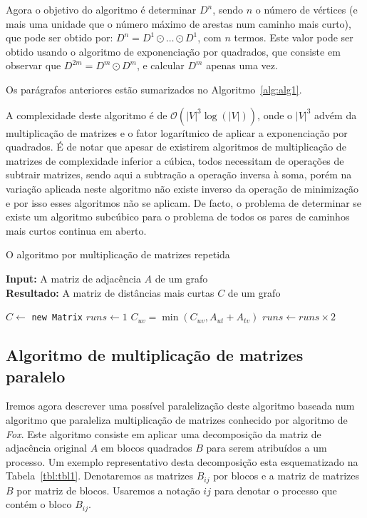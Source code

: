 \documentclass[10pt,a4paper,oneside]{article}
\newcommand{\BigO}[1]{\mathcal{O}(#1)}
\begin{document}
Agora o objetivo do algoritmo é determinar $D^n$, sendo $n$ o número
de vértices (e mais uma unidade que o número máximo de arestas num
caminho mais curto), que pode ser obtido por: $D^n = D^1 \odot \ldots
\odot D^1$, com $n$ termos. Este valor pode ser obtido usando o
algoritmo de exponenciação por quadrados, que consiste em observar que
$D^{2m} = D^m \odot D^m$, e calcular $D^m$ apenas uma vez.

Os parágrafos anteriores estão sumarizados no Algoritmo~\ref{alg:alg1}.

A complexidade deste algoritmo é de $\BigO{|V|^3\log{(|V|)}}$, onde o
$|V|^3$ advém da multiplicação de matrizes e o fator logarítmico de
aplicar a exponenciação por quadrados. É de notar que apesar de
existirem algoritmos de multiplicação de matrizes de complexidade
inferior a cúbica, todos necessitam de operações de subtrair matrizes,
sendo aqui a subtração a operação inversa à soma, porém na variação
aplicada neste algoritmo não existe inverso da operação de minimização
e por isso esses algoritmos não se aplicam. De facto, o problema de
determinar se existe um algoritmo subcúbico para o problema de todos
os pares de caminhos mais curtos continua em aberto.

\begin{algorithm}[t]
\small
\caption{O algoritmo por multiplicação de matrizes repetida}
\renewcommand{\arraystretch}{0.85}
\textbf{Input:} A matriz de adjacência $A$ de um grafo\\
\textbf{Resultado:} A matriz de distâncias mais curtas $C$ de um grafo\\
\renewcommand{\arraystretch}{1.0}
\label{alg:alg1}
\begin{algorithmic}[1]
\State $C \leftarrow $ {\tt new Matrix} 
\State $runs \leftarrow 1$
        \State $C_{uv} = \min{(C_{uv}, A_{ut} + A_{tv})}$
      \EndFor
    \EndFor
  \EndFor
  \State $runs \leftarrow runs \times 2$
\EndWhile
\end{algorithmic}
\end{algorithm}

\subsection{Algoritmo de multiplicação de matrizes paralelo}
Iremos agora descrever uma possível paralelização deste algoritmo
baseada num algoritmo que paraleliza multiplicação de matrizes
conhecido por algoritmo de \textit{Fox}. Este algoritmo consiste em
aplicar uma decomposição da matriz de adjacência original $A$ em
blocos quadrados $B$ para serem atribuídos a um processo. Um exemplo
representativo desta decomposição esta esquematizado na
Tabela~\ref{tbl:tbl1}. Denotaremos as matrizes $B_{ij}$ por blocos e a
matriz de matrizes $B$ por matriz de blocos. Usaremos a notação $ij$
para denotar o processo que contém o bloco $B_{ij}$.
\end{document}
